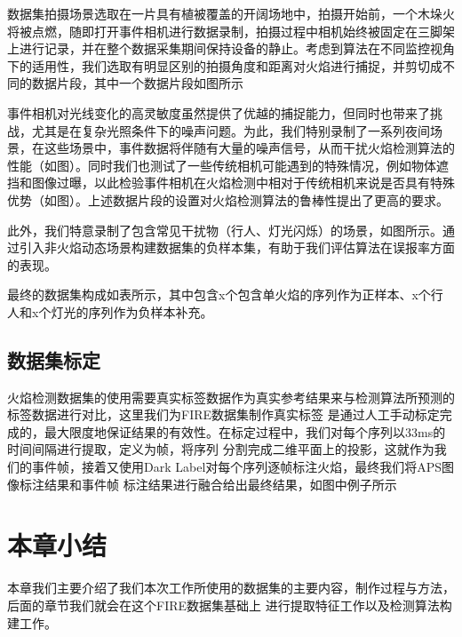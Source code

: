 数据集拍摄场景选取在一片具有植被覆盖的开阔场地中，拍摄开始前，一个木垛火将被点燃，随即打开事件相机进行数据录制，拍摄过程中相机始终被固定在三脚架上进行记录，并在整个数据采集期间保持设备的静止。考虑到算法在不同监控视角下的适用性，我们选取有明显区别的拍摄角度和距离对火焰进行捕捉，并剪切成不同的数据片段，其中一个数据片段如图所示

事件相机对光线变化的高灵敏度虽然提供了优越的捕捉能力，但同时也带来了挑战，尤其是在复杂光照条件下的噪声问题。为此，我们特别录制了一系列夜间场景，在这些场景中，事件数据将伴随有大量的噪声信号，从而干扰火焰检测算法的性能（如图）。同时我们也测试了一些传统相机可能遇到的特殊情况，例如物体遮挡和图像过曝，以此检验事件相机在火焰检测中相对于传统相机来说是否具有特殊优势（如图）。上述数据片段的设置对火焰检测算法的鲁棒性提出了更高的要求。

此外，我们特意录制了包含常见干扰物（行人、灯光闪烁）的场景，如图所示。通过引入非火焰动态场景构建数据集的负样本集，有助于我们评估算法在误报率方面的表现。

最终的数据集构成如表所示，其中包含x个包含单火焰的序列作为正样本、x个行人和x个灯光的序列作为负样本补充。

\subsection{数据集标定}
火焰检测数据集的使用需要真实标签数据作为真实参考结果来与检测算法所预测的标签数据进行对比，这里我们为FIRE数据集制作真实标签
是通过人工手动标定完成的，最大限度地保证结果的有效性。在标定过程中，我们对每个序列以33ms的时间间隔进行提取，定义为帧，将序列
分割完成二维平面上的投影，这就作为我们的事件帧，接着又使用Dark Label对每个序列逐帧标注火焰，最终我们将APS图像标注结果和事件帧
标注结果进行融合给出最终结果，如图中例子所示

\section{本章小结}
本章我们主要介绍了我们本次工作所使用的数据集的主要内容，制作过程与方法，后面的章节我们就会在这个FIRE数据集基础上
进行提取特征工作以及检测算法构建工作。
